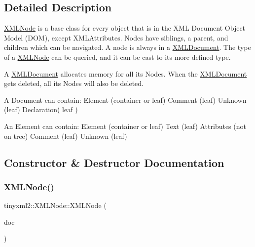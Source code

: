 \subsection{Detailed Description}
\mbox{\hyperlink{classtinyxml2_1_1_x_m_l_node}{X\+M\+L\+Node}} is a base class for every object that is in the X\+ML Document Object Model (D\+OM), except X\+M\+L\+Attributes. Nodes have siblings, a parent, and children which can be navigated. A node is always in a \mbox{\hyperlink{classtinyxml2_1_1_x_m_l_document}{X\+M\+L\+Document}}. The type of a \mbox{\hyperlink{classtinyxml2_1_1_x_m_l_node}{X\+M\+L\+Node}} can be queried, and it can be cast to its more defined type.

A \mbox{\hyperlink{classtinyxml2_1_1_x_m_l_document}{X\+M\+L\+Document}} allocates memory for all its Nodes. When the \mbox{\hyperlink{classtinyxml2_1_1_x_m_l_document}{X\+M\+L\+Document}} gets deleted, all its Nodes will also be deleted.

\begin{DoxyVerb}A Document can contain: Element (container or leaf)
                        Comment (leaf)
                        Unknown (leaf)
                        Declaration( leaf )

An Element can contain: Element (container or leaf)
                        Text    (leaf)
                        Attributes (not on tree)
                        Comment (leaf)
                        Unknown (leaf)\end{DoxyVerb}
 

\subsection{Constructor \& Destructor Documentation}
\mbox{\label{classtinyxml2_1_1_x_m_l_node_a29868df6ca383d574f584dfdd15105b6}} 
\subsubsection{\texorpdfstring{X\+M\+L\+Node()}{XMLNode()}}
{\footnotesize\ttfamily tinyxml2\+::\+X\+M\+L\+Node\+::\+X\+M\+L\+Node (\begin{DoxyParamCaption}\item[{\mbox{\hyperlink{classtinyxml2_1_1_x_m_l_document}{X\+M\+L\+Document}} $\ast$}]{doc }\end{DoxyParamCaption})\hspace{0.3cm}{\ttfamily [protected]}}


